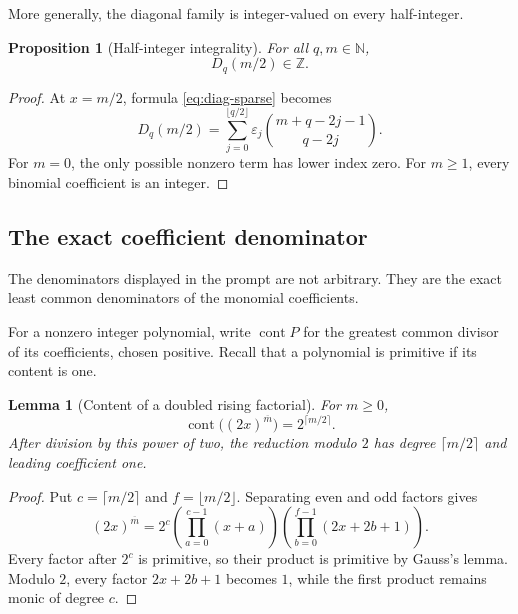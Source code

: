 \documentclass[11pt]{article}
\newtheorem{proposition}[theorem]{Proposition}
\newtheorem{lemma}[theorem]{Lemma}
\theoremstyle{definition}
\theoremstyle{remark}
\newcommand{\N}{\mathbb N}
\newcommand{\Z}{\mathbb Z}
\newcommand{\eps}{\varepsilon}
\newcommand{\Diag}{D}
\newcommand{\rising}[2]{#1^{\overline{#2}}}
\newcommand{\cont}{\operatorname{cont}}
\begin{document}
More generally, the diagonal family is integer-valued on every half-integer.

\begin{proposition}[Half-integer integrality]
For all \(q,m\in\N\),
\begin{equation}
 \Diag_q(m/2)\in\Z.                                        \label{eq:half-int-integrality}
\end{equation}
\end{proposition}

\begin{proof}
At \(x=m/2\), formula \cref{eq:diag-sparse} becomes
\[
 \Diag_q(m/2)=\sum_{j=0}^{\lfloor q/2\rfloor}
 \eps_j\binom{m+q-2j-1}{q-2j}.
\]
For \(m=0\), the only possible nonzero term has lower index zero.  For
\(m\geq1\), every binomial coefficient is an integer.
\end{proof}

\subsection{The exact coefficient denominator}

The denominators displayed in the prompt are not arbitrary.  They are the
exact least common denominators of the monomial coefficients.

For a nonzero integer polynomial, write \(\cont P\) for the greatest common
divisor of its coefficients, chosen positive.  Recall that a polynomial is
primitive if its content is one.

\begin{lemma}[Content of a doubled rising factorial]\label{lem:rising-content}
For \(m\geq0\),
\begin{equation}
 \cont\bigl(\rising{(2x)}m\bigr)=2^{\lceil m/2\rceil}.      \label{eq:rising-content}
\end{equation}
After division by this power of two, the reduction modulo \(2\) has degree
\(\lceil m/2\rceil\) and leading coefficient one.
\end{lemma}

\begin{proof}
Put \(c=\lceil m/2\rceil\) and \(f=\lfloor m/2\rfloor\).
Separating even and odd factors gives
\begin{equation}
 \rising{(2x)}m
 =2^c
 \left(\prod_{a=0}^{c-1}(x+a)\right)
 \left(\prod_{b=0}^{f-1}(2x+2b+1)\right).                 \label{eq:rising-factor-split}
\end{equation}
Every factor after \(2^c\) is primitive, so their product is primitive by
Gauss's lemma.  Modulo \(2\), every factor \(2x+2b+1\) becomes \(1\), while
the first product remains monic of degree \(c\).
\end{proof}
\end{document}
